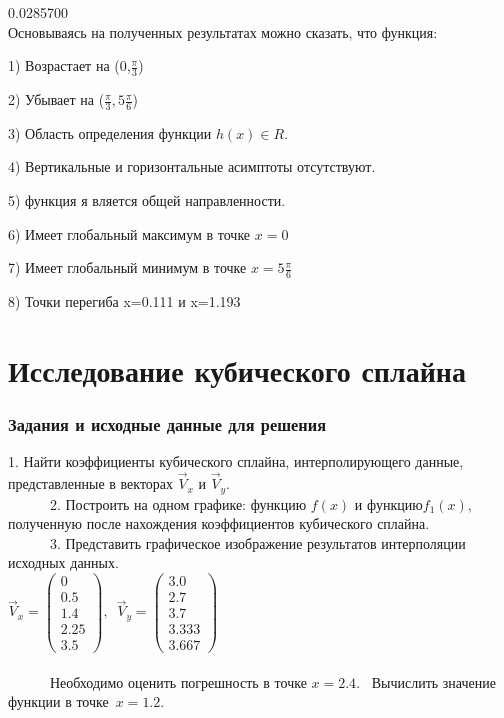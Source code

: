\documentclass[russian,utf8,nocolumnxxxi,nocolumnxxxii]{eskdtext}
\begin{document}
    0.0285700 \\
    
Основываясь на полученных результатах можно сказать, что функция:

1) Возрастает на (0,$\frac{\pi}{3}$)

2) Убывает на ($\frac{\pi}{3},5\frac{\pi}{6}$)

3) Область определения функции $h(x) \in R$. 

4) Вертикальные и горизонтальные асимптоты отсутствуют.

5) функция я вляется общей направленности.

6) Имеет глобальный максимум в точке $x=0$

7) Имеет глобальный минимум в точке $x=5\frac{\pi}{6}$

8) Точки перегиба x=0.111 и x=1.193

\newpage
\section{Исследование кубического сплайна}
\subsubsection{Задания и исходные данные для решения}
      $ $1. Найти коэффициенты кубического сплайна, интерполирующего данные, представленные в векторах$\,\,  {\vec{V}_x} \,\,$и$\,\, {\vec{V}_y.}$ \\
      $ {\,\,\,\,\,\,\,\,\,\,\,\,\,\,\,\,\,\,}$2. Построить на одном графике: функцию$\,\, {f(x)}\,\, $и$\,\,  функцию {f_1(x)}, $полученную после нахождения коэффициентов кубического сплайна.$ $ \\
      $ {\,\,\,\,\,\,\,\,\,\,\,\,\,\,\,\,\,\,}$3. Представить графическое изображение результатов интерполяции исходных данных$ $.\\

      $\vec{V}_x=\left(\begin{array}{c}0\\0.5\\1.4\\2.25\\3.5\end{array}\right),
      \,\,\,\vec{V}_y=\left(\begin{array}{c}3.0\\2.7\\3.7\\3.333\\3.667\end{array}\right)$ \\\\
      $ {\,\,\,\,\,\,\,\,\,\,\,\,\,\,\,\,\,\,}$Необходимо оценить погрешность в точке $ {x = 2.4}. $\,\,\,\,\,Вычислить значение функции в точке $\,{x = 1.2}.$\\
\newpage
\end{document}
